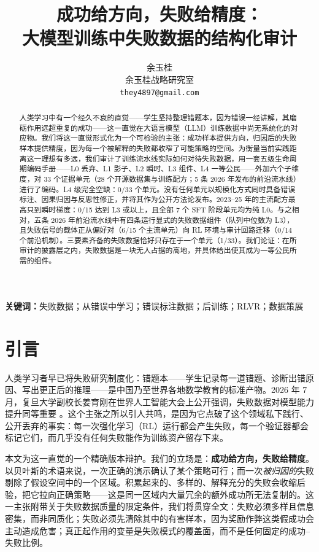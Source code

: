 \documentclass[10pt,fontset=fandol]{ctexart}
\title{\textbf{成功给方向，失败给精度：\\大模型训练中失败数据的结构化审计}}
\author{余玉桂\\
余玉桂战略研究室\\
\texttt{they4897@gmail.com}
}
\date{}
\begin{document}
\maketitle

\begin{abstract}
\noindent 人类学习中有一个经久不衰的直觉——学生坚持整理错题本，因为错误一经讲解，其磨砺作用远超重复的成功——这一直觉在大语言模型（LLM）训练数据中尚无系统化的对应物。我们将这一直觉形式化为一个可检验的主张：成功样本提供方向，归因后的失败样本提供精度，因为每一个被解释的失败都收窄了可能策略的空间。为衡量当前实践距离这一理想有多远，我们审计了训练流水线实际如何对待失败数据，用一套五级生命周期编码手册——L0 丢弃、L1 影子、L2 瞬时、L3 组件、L4 一等公民——外加六个子维度，对 33 个证据单元（28 个开源数据集与训练配方；5 条 2026 年发布的前沿流水线）进行了编码。L4 级完全空缺：0/33 个单元。没有任何单元以规模化方式同时具备错误标注、因果归因与反思性修正，并将其作为公开方法论发布。2023--25 年的主流配方最高只到瞬时梯度：0/15 达到 L3 或以上，且全部 7 个 SFT 阶段单元均为纯 L0。与之相对，五条 2026 年前沿流水线中有四条运行显式的失败数据组件（队列中位数为 L3），且失败信号的载体正从偏好对（6/15 个主流单元）向 RL 环境与审计回路迁移（0/14 个前沿机制）。三要素齐备的失败数据恰好只存在于一个单元（1/33）。我们论证：在所审计的披露层之内，失败数据是一块无人占据的高地，并具体给出使其成为一等公民所需的组件。
\end{abstract}

\medskip
\noindent\textbf{关键词：}失败数据；从错误中学习；错误标注数据；后训练；RLVR；数据策展

\section{引言}

人类学习者早已将失败研究制度化：错题本——学生记录每一道错题、诊断出错原因、写出更正后的推理——是中国乃至世界各地数学教育的标准产物。2026 年 7 月，复旦大学副校长姜育刚在世界人工智能大会上公开强调，失败数据对模型能力提升同等重要 \cite{waic2026}。这个主张之所以引人共鸣，是因为它点破了这个领域私下践行、公开丢弃的事实：每一次强化学习（RL）运行都会产生失败，每一个验证器都会标记它们，而几乎没有任何失败能作为训练资产留存下来。

本文为这一直觉的一个精确版本辩护。\label{sec:intro-arg}我们的立场是：\textbf{成功给方向，失败给精度}。以贝叶斯的术语来说，一次正确的演示确认了某个策略可行；而一次\emph{被归因的}失败剔除了假设空间中的一个区域。积累起来的、多样的、解释充分的失败会收缩后验，把它拉向正确策略——这是同一区域内大量冗余的额外成功所无法复制的。这一主张附带关于失败数据质量的限定条件，我们将贯穿全文：失败必须多样且信息密集，而非同质化；失败必须先清除其中的有害样本，因为奖励作弊这类假成功会主动造成危害；真正起作用的变量是失败模式的覆盖面，而不是任何固定的成功--失败比例。
\end{document}
